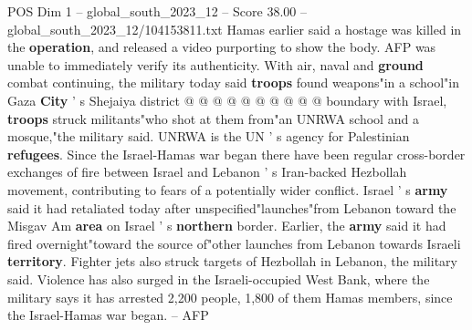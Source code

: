 \begin{textsample}{POS Dim 1 – global\_south\_2023\_12 – Score 38.00 – global\_south\_2023\_12/104153811.txt}
Hamas earlier said a hostage was killed in the \textbf{operation}, and released a video purporting to show the body.
AFP was unable to immediately verify its authenticity.
With air, naval and \textbf{ground} combat continuing, the military today said \textbf{troops} found weapons"in a school"in Gaza \textbf{City} ' s Shejaiya district @ @ @ @ @ @ @ @ @ @ boundary with Israel, \textbf{troops} struck militants"who shot at them from"an UNRWA school and a mosque,"the military said.
UNRWA is the UN ' s agency for Palestinian \textbf{refugees}.
Since the Israel-Hamas war began there have been regular cross-border exchanges of fire between Israel and Lebanon ' s Iran-backed Hezbollah movement, contributing to fears of a potentially wider conflict.
Israel ' s \textbf{army} said it had retaliated today after unspecified"launches"from Lebanon toward the Misgav Am \textbf{area} on Israel ' s \textbf{northern} border.
Earlier, the \textbf{army} said it had fired overnight"toward the source of"other launches from Lebanon towards Israeli \textbf{territory}.
Fighter jets also struck targets of Hezbollah in Lebanon, the military said.
Violence has also surged in the Israeli-occupied West Bank, where the military says it has arrested 2,200 people, 1,800 of them Hamas members, since the Israel-Hamas war began. -- AFP

\end{textsample}
